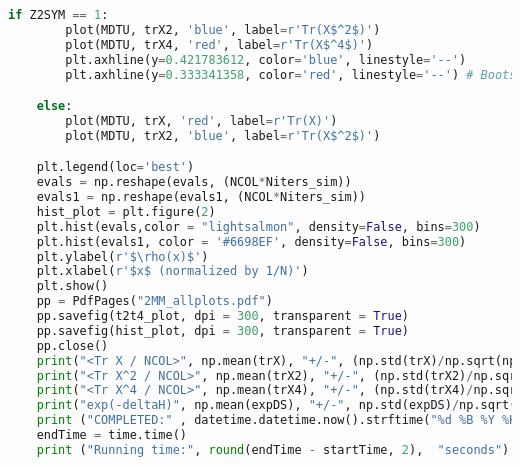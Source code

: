 \begin{footnotesize}
\begin{lstlisting}[language=Python]
    if Z2SYM == 1:
        plot(MDTU, trX2, 'blue', label=r'Tr(X$^2$)')
        plot(MDTU, trX4, 'red', label=r'Tr(X$^4$)')
        plt.axhline(y=0.421783612, color='blue', linestyle='--')
        plt.axhline(y=0.333341358, color='red', linestyle='--') # Bootstrap results

    else:
        plot(MDTU, trX, 'red', label=r'Tr(X)')
        plot(MDTU, trX2, 'blue', label=r'Tr(X$^2$)')

    plt.legend(loc='best')
    evals = np.reshape(evals, (NCOL*Niters_sim)) 
    evals1 = np.reshape(evals1, (NCOL*Niters_sim))
    hist_plot = plt.figure(2)
    plt.hist(evals,color = "lightsalmon", density=False, bins=300) 
    plt.hist(evals1, color = '#6698EF', density=False, bins=300)  
    plt.ylabel(r'$\rho(x)$')
    plt.xlabel(r'$x$ (normalized by 1/N)')
    plt.show()
    pp = PdfPages("2MM_allplots.pdf")
    pp.savefig(t2t4_plot, dpi = 300, transparent = True)
    pp.savefig(hist_plot, dpi = 300, transparent = True)
    pp.close()
    print("<Tr X / NCOL>", np.mean(trX), "+/-", (np.std(trX)/np.sqrt(np.size(trX) - 1.0)))
    print("<Tr X^2 / NCOL>", np.mean(trX2), "+/-", (np.std(trX2)/np.sqrt(np.size(trX2) - 1.0)))
    print("<Tr X^4 / NCOL>", np.mean(trX4), "+/-", (np.std(trX4)/np.sqrt(np.size(trX4) - 1.0)))
    print("exp(-deltaH)", np.mean(expDS), "+/-", np.std(expDS)/np.sqrt(np.size(expDS) - 1.0))
    print ("COMPLETED:" , datetime.datetime.now().strftime("%d %B %Y %H:%M:%S")) 
    endTime = time.time() 
    print ("Running time:", round(endTime - startTime, 2),  "seconds")
\end{lstlisting}
\end{footnotesize} 